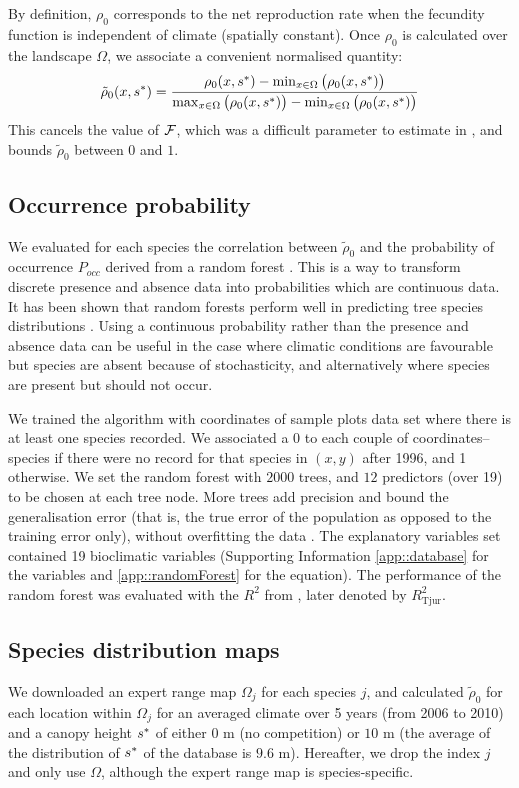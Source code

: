 By definition, $ \rho_0 $ corresponds to the net reproduction rate when the fecundity function is independent of climate (\ie spatially constant). Once $ \rho_0 $ is calculated over the landscape $ \Omega $, we associate a convenient normalised quantity:
\begin{equation} \label{eq::rho0_scaled}
	\tilde \rho_0(x, {s}^{*}) = \frac{\rho_0(x, {s}^{*}) - \min_{x \in \Omega} \big(\rho_0(x, {s}^{*}) \big)}{\max_{x \in \Omega} \big(\rho_0(x, {s}^{*}) \big) - \min_{x \in \Omega} \big(\rho_0(x, {s}^{*}) \big)}
\end{equation}
This cancels the value of $ \mathcal{F} $, which was a difficult parameter to estimate in \citet{Purves2008}, and bounds $ \tilde \rho_0 $ between $ 0 $ and $ 1 $.

\subsection{Occurrence probability}
We evaluated for each species the correlation between $ \tilde \rho_0 $ and the probability of occurrence $ P_{occ} $ derived from a random forest \citep[R package]{randomForest}. This is a way to transform discrete presence and absence data into probabilities which are continuous data. It has been shown that random forests perform well in predicting tree species distributions \citep{Prasad2006}. Using a continuous probability rather than the presence and absence data can be useful in the case where climatic conditions are favourable but species are absent because of stochasticity, and alternatively where species are present but should not occur.

We trained the algorithm with coordinates of sample plots data set where there is at least one species recorded. We associated a 0 to each couple of coordinates--species if there were no record for that species in $ (x, y) $ after 1996, and 1 otherwise. We set the random forest with $ 2000 $ trees, and $ 12 $ predictors (over 19) to be chosen at each tree node. More trees add precision and bound the generalisation error (that is, the true error of the population as opposed to the training error only), without overfitting the data \citep{Prasad2006}. The explanatory variables set contained 19 bioclimatic variables (Supporting Information \ref{app::database} for the variables and \ref{app::randomForest} for the equation). The performance of the random forest was evaluated with the $ R^2 $ from \citet{Tjur2009}, later denoted by $ R_{\text{Tjur}}^2 $.

\subsection{Species distribution maps}
We downloaded an expert range map $ \Omega_j $ \citep{Prasad2003, Little1971} for each species $ j $, and calculated $ \tilde \rho_0 $ for each location within $ \Omega_j $ for an averaged climate over 5 years (from 2006 to 2010) and a canopy height $ {s}^{*} $ of either $ 0 $ m (no competition) or $ 10 $ m (the average of the distribution of $ {s}^{*} $ of the database is $ 9.6 $ m). Hereafter, we drop the index $ j $ and only use $ \Omega $, although the expert range map is species-specific.

